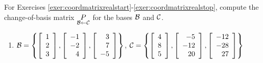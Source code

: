\noindent For Exercises \ref{exer:coordmatrixrealstart}-\ref{exer:coordmatrixrealstop}, compute the change-of-basis matrix $\underset{\B\leftarrow \c}{P}$ for the bases $\B$ and $\c$.
\begin{enumerate}[!HW!, label=$\spadesuit$ \arabic*., ref=\arabic*]
\item\label{exer:coordmatrixrealstart} $\mathcal{B} = \left\{\vr{1\\2\\3}, \vr{-1\\-2\\4}, \vr{3\\7\\-5}\right\}$, $\mathcal{C} = \left\{\vr{4\\8\\5}, \vr{-5\\-12\\20}, \vr{-12\\-28\\27}\right\}$
\end{enumerate}
